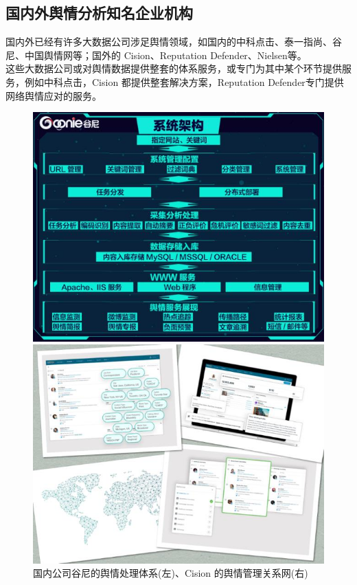 \documentclass[11pt,a4paper,utf8]{article}
\begin{document}
\subsection{国内外舆情分析知名企业机构} 
国内外已经有许多大数据公司涉足舆情领域，如国内的中科点击、泰一指尚、谷尼、中国舆情网等；国外的 Cision、Reputation Defender、Nielsen等。 \\

这些大数据公司或对舆情数据提供整套的体系服务，或专门为其中某个环节提供服务，例如中科点击，Cision 都提供整套解决方案，Reputation Defender专门提供网络舆情应对的服务。
 

\begin{figure}[H]
\centering 
\subfigure 
{  
    \begin{minipage}[b]{.4\linewidth}
        \centering
        \includegraphics[scale=0.45]{images/谷尼.png}
     \end{minipage}
}
\subfigure 
{  
    \begin{minipage}[b]{.4\linewidth}
        \centering
        \includegraphics[scale=0.45]{images/cision.png} 
    \end{minipage}
}
\caption{国内公司谷尼的舆情处理体系(左)、Cision 的舆情管理关系网(右)}
\end{figure}
\end{document}
